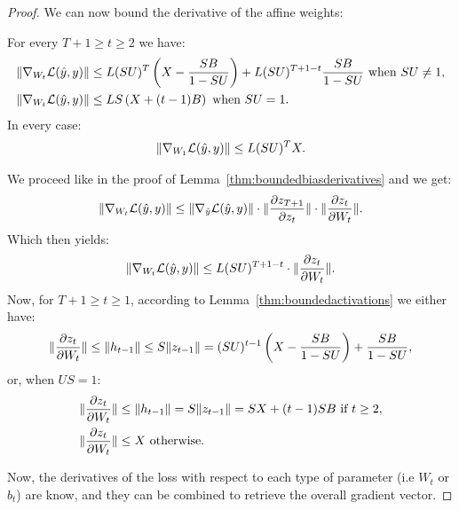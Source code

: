 \begin{proof}
    We can now bound the derivative of the affine weights:
    
    
    \begin{lemma}\label{thm:boundedweightderivatives}
        For every $T+1\geq t\geq 2$ we have:
        \begin{align}
            \|\nabla_{W_t}\mathcal{L}(\hat y,y)\|&\leq L(SU)^T\left(X-\frac{SB}{1-SU}\right)+L(SU)^{T+1-t}\frac{SB}{1-SU}\text{ when }SU\neq 1,\\
            \|\nabla_{W_t}\mathcal{L}(\hat y,y)\|&\leq LS\left(X+(t-1)B\right)\text{ when }SU= 1.\\
        \end{align}
        In every case:
        \begin{equation}
            \|\nabla_{W_1}\mathcal{L}(\hat y,y)\|\leq L(SU)^TX.
        \end{equation}    
    \end{lemma}
    \begin{subproof}
    We proceed like in the proof of Lemma~\ref{thm:boundedbiasderivatives} and we get:
        \begin{equation}
            \|\nabla_{W_t}\mathcal{L}(\hat y,y)\|\leq \|\nabla_{\hat y}\mathcal{L}(\hat y,y)\|\cdot\|\frac{\partial z_{T+1}}{\partial z_t}\|\cdot\|\frac{\partial z_t}{\partial W_t}\|.
        \end{equation}
    Which then yields:
        \begin{equation}
            \|\nabla_{W_t}\mathcal{L}(\hat y,y)\|\leq L(SU)^{T+1-t}\cdot\|\frac{\partial z_t}{\partial W_t}\|.
        \end{equation}
    Now, for $T+1\geq t\geq 1$, according to Lemma~\ref{thm:boundedactivations} we either have:
    \begin{equation}
        \|\frac{\partial z_t}{\partial W_t}\|\leq \|h_{t-1}\|\leq S\|z_{t-1}\|=(SU)^{t-1}\left(X-\frac{SB}{1-SU}\right)+\frac{SB}{1-SU},
    \end{equation}
    or, when $US=1$:
    \begin{align}
        \|\frac{\partial z_t}{\partial W_t}\|&\leq \|h_{t-1}\|=S\|z_{t-1}\|=SX+(t-1)SB\text{ if }t\geq 2,\\
        \|\frac{\partial z_t}{\partial W_t}\|&\leq X\text{ otherwise}.
    \end{align}  
    \end{subproof}
    
    Now, the derivatives of the loss with respect to each type of parameter (i.e $W_t$ or $b_t$) are know, and they can be combined to retrieve the overall gradient vector.  
    

\end{proof}
